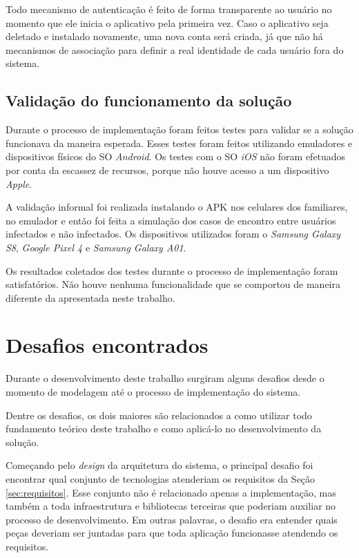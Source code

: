 Todo mecanismo de autenticação é feito de forma transparente ao usuário no momento que ele inicia o aplicativo pela primeira vez. Caso o aplicativo seja deletado e instalado novamente, uma nova conta será criada, já que não há mecanismos de associação para definir a real identidade de cada usuário fora do sistema.

\subsection{Validação do funcionamento da solução}

Durante o processo de implementação foram feitos testes para validar se a solução funcionava da maneira esperada. Esses testes foram feitos utilizando emuladores e dispositivos físicos do SO \textit{Android}. Os testes com o SO \textit{iOS} não foram efetuados por conta da escassez de recursos, porque não houve acesso a um dispositivo \textit{Apple}.

A validação informal foi realizada instalando o APK nos celulares dos familiares, no emulador e então foi feita a simulação dos casos de encontro entre usuários infectados e não infectados. Os dispositivos utilizados foram o \textit{Samsung Galaxy S8}, \textit{Google Pixel 4} e \textit{Samsung Galaxy A01}.

Os resultados coletados dos testes durante o processo de implementação foram satisfatórios. Não houve nenhuma funcionalidade que se comportou de maneira diferente da apresentada neste trabalho. 

\section{Desafios encontrados}

Durante o desenvolvimento deste trabalho surgiram alguns desafios desde o momento de modelagem até o processo de implementação do sistema.

Dentre os desafios, os dois maiores são relacionados a como utilizar todo fundamento teórico deste trabalho e como aplicá-lo no desenvolvimento da solução.

Começando pelo \textit{design} da arquitetura do sistema, o principal desafio foi encontrar qual conjunto de tecnologias atenderiam os requisitos da Seção \ref{sec:requisitos}. Esse conjunto não é relacionado apenas a implementação, mas também a toda infraestrutura e bibliotecas terceiras que poderiam auxiliar no processo de desenvolvimento. Em outras palavras, o desafio era entender quais peças deveriam ser juntadas para que toda aplicação funcionasse atendendo os requisitos.

